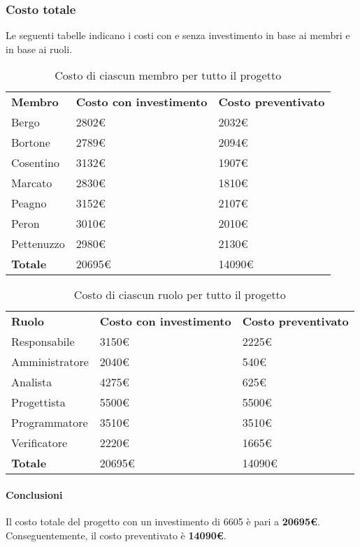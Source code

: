 	\subsubsection{Costo totale}
		Le seguenti tabelle indicano i costi con e senza investimento in base ai membri e in base ai ruoli.
		\begin{table}[h]
			\centering
			\begin{tabular}{| l | l | l |}
				\rowcolor{LightBlue}
				\textbf{\color{white}Membro}
				& \textbf{\color{white}Costo con investimento}
				& \textbf{\color{white}Costo preventivato}\\
				
				Bergo				& 2802€ & 2032€\\
				Bortone			& 2789€ & 2094€\\
				Cosentino		& 3132€ & 1907€\\
				Marcato			& 2830€ & 1810€\\
				Peagno				& 3152€ & 2107€\\
				Peron				& 3010€ & 2010€\\
				Pettenuzzo		& 2980€ & 2130€\\ \hline
				\textbf{Totale} & 20695€ & 14090€\\ \hline
			\end{tabular}
			\caption{Costo di ciascun membro per tutto il progetto}
		\end{table}
		
		\begin{table}[h]
			\centering
			\begin{tabular}{| l | l | l |}
				\rowcolor{LightBlue}
				\textbf{\color{white}Ruolo}
				& \textbf{\color{white}Costo con investimento}
				& \textbf{\color{white}Costo preventivato}\\
				
				Responsabile 		& 3150€ & 2225€\\
				Amministratore 	& 2040€ & 540€\\
				Analista 				& 4275€ & 625€\\			
				Progettista 			& 5500€ & 5500€\\
				Programmatore 		& 3510€ & 3510€\\
				Verificatore 		& 2220€ & 1665€\\ \hline
				\textbf{Totale} 	& 20695€ & 14090€\\ \hline
			\end{tabular}		
			\caption{Costo di ciascun ruolo per tutto il progetto}
		\end{table}
		
		\paragraph{Conclusioni\\}
		Il costo totale del progetto con un investimento di 6605 è pari a \textbf{20695€}. Conseguentemente, il costo preventivato è \textbf{14090€}.